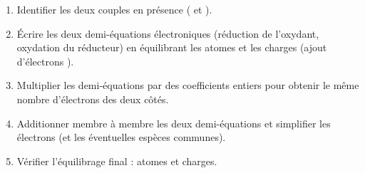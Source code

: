 \documentclass[11pt]{article}
\begin{document}
\begin{methode}
\begin{enumerate}
\item Identifier les deux couples en présence ( et ).
\item Écrire les deux demi-équations électroniques (réduction de l'oxydant, oxydation du réducteur) en équilibrant les atomes et les charges (ajout d'électrons ).
\item Multiplier les demi-équations par des coefficients entiers pour obtenir le même nombre d'électrons des deux côtés.
\item Additionner membre à membre les deux demi-équations et simplifier les électrons (et les éventuelles espèces communes).
\item Vérifier l'équilibrage final : atomes et charges.
\end{enumerate}
\end{methode}
\end{document}
